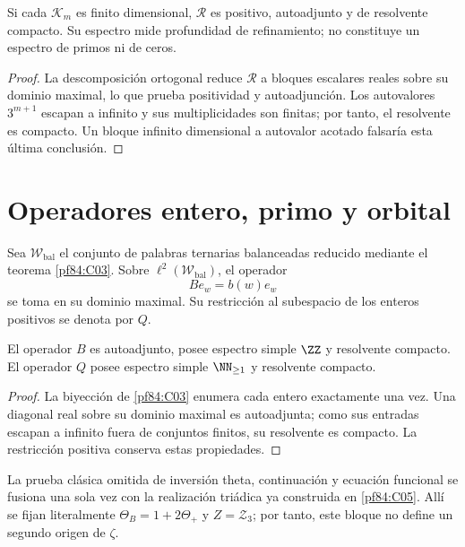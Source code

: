 \begin{theorem}
\label{pf84:C02}
Si cada \(\mathcal K_m\) es finito dimensional, \(\mathcal R\) es positivo,
autoadjunto y de resolvente compacto. Su espectro mide profundidad de
refinamiento; no constituye un espectro de primos ni de ceros.
\end{theorem}

\begin{proof}
La descomposición ortogonal reduce \(\mathcal R\) a bloques escalares reales
sobre su dominio maximal, lo que prueba positividad y autoadjunción. Los
autovalores \(3^{m+1}\) escapan a infinito y sus multiplicidades son finitas;
por tanto, el resolvente es compacto. Un bloque infinito dimensional a
autovalor acotado falsaría esta última conclusión.
\end{proof}

\section{Operadores entero, primo y orbital}

Sea \(\mathscr W_{\mathrm{bal}}\) el conjunto de palabras ternarias
balanceadas reducido mediante el teorema
\cref{pf84:C03}. Sobre \(\ell^2(\mathscr W_{\mathrm{bal}})\), el operador
\[
 Be_w=b(w)e_w
\]
se toma en su dominio maximal. Su restricción al subespacio de los enteros
positivos se denota por \(Q\).

\begin{theorem}
\label{pf84:C04}
El operador \(B\) es autoadjunto, posee espectro simple \(\ZZ\) y
resolvente compacto. El operador \(Q\) posee espectro simple
\(\NN_{\ge1}\) y resolvente compacto.
\end{theorem}

\begin{proof}
La biyección de \cref{pf84:C03} enumera cada entero exactamente una vez. Una
diagonal real sobre su dominio maximal es autoadjunta; como sus entradas
escapan a infinito fuera de conjuntos finitos, su resolvente es compacto. La
restricción positiva conserva estas propiedades.
\end{proof}

La prueba clásica omitida de inversión theta, continuación y ecuación
funcional se fusiona una sola vez con la realización triádica ya construida
en \cref{pf84:C05}. Allí se fijan literalmente
\(\Theta_B=1+2\Theta_+\) y \(Z=\mathcal Z_3\); por tanto, este bloque no
define un segundo origen de \(\zeta\).

